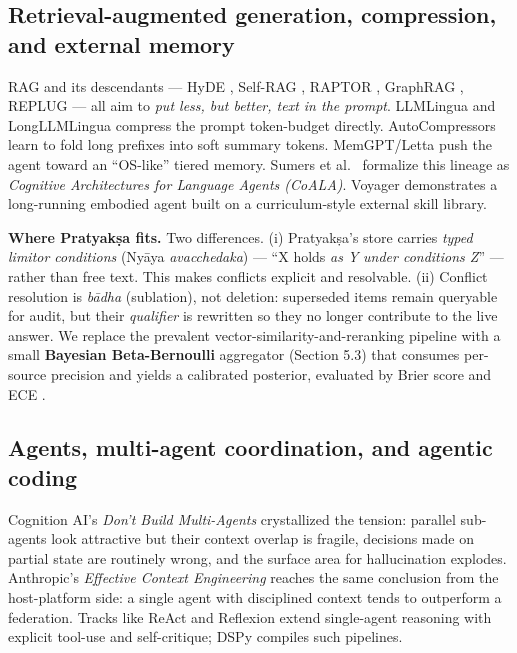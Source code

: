 \subsection{Retrieval-augmented generation, compression, and external memory}\label{retrieval-augmented-generation-compression-and-external-memory}

RAG \citep{lewis2020rag} and its descendants --- HyDE \citep{gao2023hyde}, Self-RAG \citep{asai2024selfrag}, RAPTOR \citep{sarthi2024raptor}, GraphRAG \citep{edge2024graphrag}, REPLUG \citep{shi2023less} --- all aim to \emph{put less, but better, text in the prompt}. LLMLingua \citep{jiang2023llmlingua} and LongLLMLingua \citep{jiang2024longllmlingua} compress the prompt token-budget directly. AutoCompressors \citep{chevalier2023autocompressors} learn to fold long prefixes into soft summary tokens. MemGPT/Letta \citep{packer2023memgpt} push the agent toward an ``OS-like'' tiered memory. Sumers et al.~\citeyearpar{sumers2024coala} formalize this lineage as \emph{Cognitive Architectures for Language Agents (CoALA)}. Voyager \citep{wang2024voyager} demonstrates a long-running embodied agent built on a curriculum-style external skill library.

\textbf{Where Pratyakṣa fits.} Two differences. (i) Pratyakṣa's store carries \emph{typed limitor conditions} (Nyāya \emph{avacchedaka}) --- ``X holds \emph{as Y} \emph{under conditions Z}'' --- rather than free text. This makes conflicts explicit and resolvable. (ii) Conflict resolution is \emph{bādha} (sublation), not deletion: superseded items remain queryable for audit, but their \emph{qualifier} is rewritten so they no longer contribute to the live answer. We replace the prevalent vector-similarity-and-reranking pipeline with a small \textbf{Bayesian Beta-Bernoulli} aggregator (Section 5.3) that consumes per-source precision and yields a calibrated posterior, evaluated by Brier score and ECE \citep{naeini2015ece, brier1950score, guo2017calibration}.

\subsection{Agents, multi-agent coordination, and agentic coding}\label{agents-multi-agent-coordination-and-agentic-coding}

Cognition AI's \emph{Don't Build Multi-Agents} \citep{yan2025dontbuild} crystallized the tension: parallel sub-agents look attractive but their context overlap is fragile, decisions made on partial state are routinely wrong, and the surface area for hallucination explodes. Anthropic's \emph{Effective Context Engineering} \citep{anthropic2025contexteng} reaches the same conclusion from the host-platform side: a single agent with disciplined context tends to outperform a federation. Tracks like ReAct \citep{yao2023react} and Reflexion \citep{shinn2023reflexion} extend single-agent reasoning with explicit tool-use and self-critique; DSPy \citep{khattab2023dspy} compiles such pipelines.

